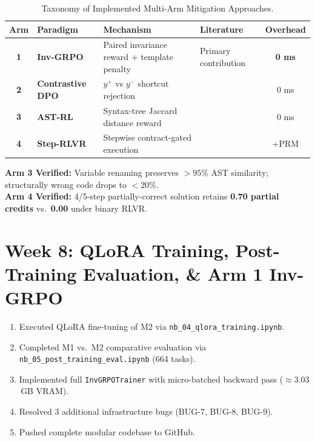 \documentclass[12pt, a4paper]{article}
\begin{document}
\begin{table}[H]
\centering
\small
\caption{Taxonomy of Implemented Multi-Arm Mitigation Approaches.}
\label{tab:mitigation_arms}
\begin{tabularx}{\textwidth}{c l p{3.6cm} p{3.4cm} c}
\toprule
\textbf{Arm} & \textbf{Paradigm} & \textbf{Mechanism} & \textbf{Literature} & \textbf{Overhead} \\
\midrule
\textbf{1} & \textbf{Inv-GRPO}       & Paired invariance reward + template penalty & Primary contribution         & \textbf{0 ms} \\
\textbf{2} & \textbf{Contrastive DPO} & $y^+$ vs $y^-$ shortcut rejection          & \cite{supercorrect, recode_contrastive} & 0 ms \\
\textbf{3} & \textbf{AST-RL}          & Syntax-tree Jaccard distance reward         & \cite{treediff, veriseek}              & 0 ms \\
\textbf{4} & \textbf{Step-RLVR}       & Stepwise contract-gated execution           & \cite{codeprm, execverify}             & +PRM \\
\bottomrule
\end{tabularx}
\end{table}

\textbf{Arm 3 Verified:} Variable renaming preserves $>95\%$ AST similarity; structurally wrong code drops to $<20\%$.\\
\textbf{Arm 4 Verified:} 4/5-step partially-correct solution retains \textbf{0.70 partial credits} vs.\ \textbf{0.00} under binary RLVR.

\section{Week 8: QLoRA Training, Post-Training Evaluation, \& Arm 1 Inv-GRPO}

\begin{week8box}[title={\faFlask\ Week 8 Milestones}]
\begin{enumerate}[leftmargin=*, label=\textbf{\arabic*.}]
  \item Executed QLoRA fine-tuning of M2 via \texttt{nb\_04\_qlora\_training.ipynb}.
  \item Completed M1 vs.\ M2 comparative evaluation via \texttt{nb\_05\_post\_training\_eval.ipynb} (664 tasks).
  \item Implemented full \texttt{InvGRPOTrainer} with micro-batched backward pass ($\approx 3.03$\,GB VRAM).
  \item Resolved 3 additional infrastructure bugs (BUG-7, BUG-8, BUG-9).
  \item Pushed complete modular codebase to GitHub.
\end{enumerate}
\end{week8box}
\end{document}

